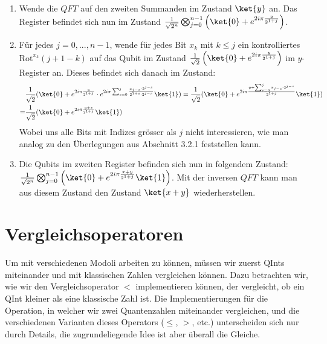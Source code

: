 \begin{enumerate}
    \item Wende die $QFT$ auf den zweiten Summanden im Zustand $\ket{y}$ an. Das Register befindet sich nun im Zustand $\frac{1}{\sqrt{2^n}}\bigotimes_{j = 0}^{n - 1}\left(\ket{0} + e^{2i\pi\frac{y}{2^{1 + j}}}\right)$.
    \item Für jedes $j = 0, ..., n - 1$, wende für jedes Bit $x_k$ mit $k \leq j$ ein kontrolliertes $\text{Rot}^{x_k}(j + 1 - k)$ auf das Qubit im Zustand $\frac{1}{\sqrt{2}}\left(\ket{0} + e^{2i\pi\frac{y}{2^{1 + j}}}\right)$ im $y$-Register an. Dieses befindet sich danach im Zustand:
    \begin{align*}
        &\frac{1}{\sqrt{2}}(\ket{0} + e^{2i\pi\frac{y}{2^{1 + j}}}\cdot e^{2i\pi\sum_{s = 0}^{j}\frac{x_{j - s}\cdot 2^{j - s}}{2^{1 + s}\cdot2^{j - s}}}\ket{1}) 
        = \frac{1}{\sqrt{2}}(\ket{0} + e^{2i\pi\frac{y + \sum_{s = 0}^{j}{x_{j - s}\cdot2^{j - s}}}{2^{1 + j}}}\ket{1}) \\ = &\frac{1}{\sqrt{2}}(\ket{0} + e^{2i\pi\frac{y + x}{2^{1 + j}}}\ket{1})
    \end{align*}
    Wobei uns alle Bits mit Indizes grösser als $j$ nicht interessieren, wie man analog zu den Überlegungen aus Abschnitt 3.2.1 feststellen kann.
    \item Die Qubits im zweiten Register befinden sich nun in folgendem Zustand: $\frac{1}{\sqrt{2^n}}\bigotimes_{j = 0}^{n - 1}\left(\ket{0} + e^{2i\pi\frac{x + y}{2^{1 + j}}}\ket{1}\right)$. Mit der inversen $QFT$ kann man aus diesem Zustand den Zustand $\ket{x + y}$ wiederherstellen.
\end{enumerate}

\section{Vergleichsoperatoren}
Um mit verschiedenen Modoli arbeiten zu können, müssen wir zuerst QInts miteinander und mit klassischen Zahlen vergleichen können. Dazu betrachten wir, wie wir den Vergleichsoperator $<$ implementieren können, der vergleicht, ob ein QInt kleiner als eine klassische Zahl ist. Die Implementierungen für die Operation, in welcher wir zwei Quantenzahlen miteinander vergleichen, und die verschiedenen Varianten dieses Operators ($\leq$, $>$, etc.) unterscheiden sich nur durch Details, die zugrundeliegende Idee ist aber überall die Gleiche.
\paragraph{}

